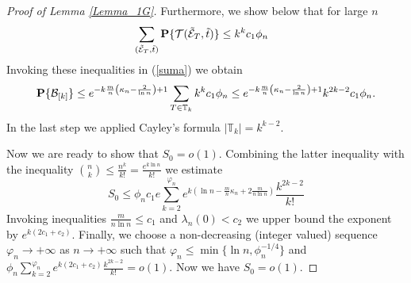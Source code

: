 \documentclass[11pt, a4paper]{article}
\newcommand{\PP}{{\bf{P}}}
\begin{document}
\begin{proof}[Proof of Lemma \ref{Lemma_1G}]
Furthermore, we show below that for large $n$ 
\begin{align}
\label{S_T+}
&
\sum_{({\tilde {\cal E}}_T,{\tilde t})}
\PP\{{\cal T}({\tilde {\cal E}}_T,{\tilde t})\}
\le  
k^kc_1\phi_n
\end{align} 
Invoking these inequalities in
 (\ref{suma}) we obtain
\begin{align*}
\PP\{{\cal B}_{[k]}\}
\le 
e^{
-
k\frac{m}{n}
\left(\kappa_n-\frac{2}{\ln n}\right)
+
1
}
\sum_{T\in {\mathbb T}_k}
k^kc_1\phi_n
\le 
e^{
-
k\frac{m}{n}
\left(
\kappa_n-\frac{2}{\ln n}
\right)
+
1}
k^{2k-2}c_1\phi_n.
\end{align*}
In the last step we applied Cayley's formula $|{\mathbb T}_k|=k^{k-2}$.

Now we are ready to show that $S_0=o(1)$. 
Combining the latter inequality with the inequality 
 $\binom{n}{k}\le \frac{n^k}{k!}=\frac{e^{k\ln n}}{k!}$ we estimate
\begin{displaymath}
S_0
\le 
\phi_n c_1e
\sum_{k=2}^{\varphi_n}
e^{k\left(\ln n-\frac{m}{n}\kappa_n+2\frac{m}{n\ln n}\right)}
\frac{k^{2k-2}}{k!}
\end{displaymath}
 Invoking inequalities 
$\frac{m}{n\ln n}\le c_1$ 
and
$\lambda_{n}(0)<c_2$
we upper bound the exponent by $e^{k(2c_1+c_2)}$.
Finally,  we choose a non-decreasing (integer valued) sequence 
$\varphi_n\to+\infty$ as $n\to+\infty$ 
such that $\varphi_n\le \min\{\ln n,\phi_n^{-1/4}\}$ 
and 
$\phi_n
\sum_{k=2}^{\varphi_n}
e^{k(2c_1+c_2)}\frac{k^{2k-2}}{k!}
=o(1)$. Now we have $S_0=o(1)$.

\bigskip



\end{proof}
\end{document}
